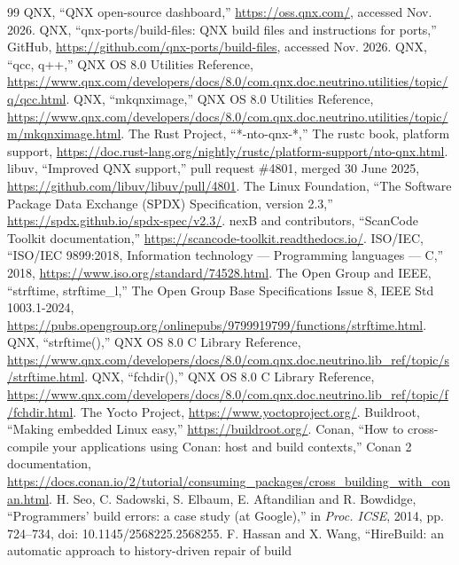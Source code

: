 \documentclass[conference]{IEEEtran}
\begin{document}
\begin{thebibliography}{99}
 QNX, ``QNX open-source dashboard,'' \url{https://oss.qnx.com/}, accessed Nov. 2026.
 QNX, ``qnx-ports/build-files: QNX build files and instructions for ports,'' GitHub,
\url{https://github.com/qnx-ports/build-files}, accessed Nov. 2026.
 QNX, ``qcc, q++,'' QNX OS 8.0 Utilities Reference,
\url{https://www.qnx.com/developers/docs/8.0/com.qnx.doc.neutrino.utilities/topic/q/qcc.html}.
 QNX, ``mkqnximage,'' QNX OS 8.0 Utilities Reference,
\url{https://www.qnx.com/developers/docs/8.0/com.qnx.doc.neutrino.utilities/topic/m/mkqnximage.html}.
 The Rust Project, ``*-nto-qnx-*,'' The rustc book, platform support,
\url{https://doc.rust-lang.org/nightly/rustc/platform-support/nto-qnx.html}.
 libuv, ``Improved QNX support,'' pull request \#4801, merged 30 June 2025,
\url{https://github.com/libuv/libuv/pull/4801}.
 The Linux Foundation, ``The Software Package Data Exchange (SPDX) Specification, version 2.3,''
\url{https://spdx.github.io/spdx-spec/v2.3/}.
 nexB and contributors, ``ScanCode Toolkit documentation,''
\url{https://scancode-toolkit.readthedocs.io/}.
 ISO/IEC, ``ISO/IEC 9899:2018, Information technology --- Programming languages --- C,'' 2018,
\url{https://www.iso.org/standard/74528.html}.
 The Open Group and IEEE, ``strftime, strftime\_l,'' The Open Group Base Specifications
Issue 8, IEEE Std 1003.1-2024, \url{https://pubs.opengroup.org/onlinepubs/9799919799/functions/strftime.html}.
 QNX, ``strftime(),'' QNX OS 8.0 C Library Reference,
\url{https://www.qnx.com/developers/docs/8.0/com.qnx.doc.neutrino.lib_ref/topic/s/strftime.html}.
 QNX, ``fchdir(),'' QNX OS 8.0 C Library Reference,
\url{https://www.qnx.com/developers/docs/8.0/com.qnx.doc.neutrino.lib_ref/topic/f/fchdir.html}.
 The Yocto Project, \url{https://www.yoctoproject.org/}.
 Buildroot, ``Making embedded Linux easy,'' \url{https://buildroot.org/}.
 Conan, ``How to cross-compile your applications using Conan: host and build contexts,'' Conan 2
documentation, \url{https://docs.conan.io/2/tutorial/consuming_packages/cross_building_with_conan.html}.
 H. Seo, C. Sadowski, S. Elbaum, E. Aftandilian and R. Bowdidge, ``Programmers' build errors: a
case study (at Google),'' in \emph{Proc. ICSE}, 2014, pp. 724--734, doi: 10.1145/2568225.2568255.
 F. Hassan and X. Wang, ``HireBuild: an automatic approach to history-driven repair of build

\end{thebibliography}
\end{document}
